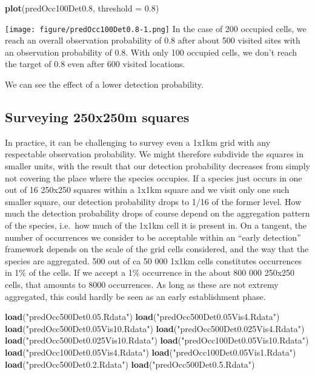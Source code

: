 \documentclass[]{article}
\newenvironment{Shaded}{\begin{snugshade}}{\end{snugshade}}
\newcommand{\KeywordTok}[1]{\textcolor[rgb]{0.13,0.29,0.53}{\textbf{#1}}}
\newcommand{\DataTypeTok}[1]{\textcolor[rgb]{0.13,0.29,0.53}{#1}}
\newcommand{\DecValTok}[1]{\textcolor[rgb]{0.00,0.00,0.81}{#1}}
\newcommand{\FloatTok}[1]{\textcolor[rgb]{0.00,0.00,0.81}{#1}}
\newcommand{\StringTok}[1]{\textcolor[rgb]{0.31,0.60,0.02}{#1}}
\newcommand{\NormalTok}[1]{#1}
\begin{document}
\begin{Shaded}
\begin{Highlighting}[]
\KeywordTok{plot}\NormalTok{(predOcc100Det0.}\DecValTok{8}\NormalTok{, }\DataTypeTok{threshold =} \FloatTok{0.8}\NormalTok{)}
\end{Highlighting}
\end{Shaded}

\texttt{[image: figure/predOcc100Det0.8-1.png]} In the case of 200
occupied cells, we reach an overall observation probability of 0.8 after
about 500 visited sites with an observation probability of 0.8. With
only 100 occupied cells, we don't reach the target of 0.8 even after 600
visited locations.

We can see the effect of a lower detection probability.

\subsection{Surveying 250x250m
squares}\label{surveying-250x250m-squares}

In practice, it can be challenging to survey even a 1x1km grid with any
respectable observation probability. We might therefore subdivide the
squares in smaller units, with the result that our detection probability
decreases from simply not covering the place where the species occupies.
If a species just occurs in one out of 16 250x250 squares within a 1x1km
square and we visit only one such smaller square, our detection
probability drops to 1/16 of the former level. How much the detection
probability drops of course depend on the aggregation pattern of the
species, i.e.~how much of the 1x1km cell it is present in. On a tangent,
the number of occurrences we consider to be acceptable within an ``early
detection'' framework depends on the scale of the grid cells considered,
and the way that the species are aggregated. 500 out of ca 50 000 1x1km
cells constitutes occurrences in 1\% of the cells. If we accept a 1\%
occurrence in the about 800 000 250x250 cells, that amounts to 8000
occurrences. As long as these are not extremy aggregated, this could
hardly be seen as an early establishment phase.

\begin{Shaded}
\begin{Highlighting}[]
\KeywordTok{load}\NormalTok{(}\StringTok{"predOcc500Det0.05.Rdata"}\NormalTok{)}
\KeywordTok{load}\NormalTok{(}\StringTok{"predOcc500Det0.05Vis4.Rdata"}\NormalTok{)}
\KeywordTok{load}\NormalTok{(}\StringTok{"predOcc500Det0.05Vis10.Rdata"}\NormalTok{)}
\KeywordTok{load}\NormalTok{(}\StringTok{"predOcc500Det0.025Vis4.Rdata"}\NormalTok{)}
\KeywordTok{load}\NormalTok{(}\StringTok{"predOcc500Det0.025Vis10.Rdata"}\NormalTok{)}
\KeywordTok{load}\NormalTok{(}\StringTok{"predOcc100Det0.05Vis10.Rdata"}\NormalTok{)}
\KeywordTok{load}\NormalTok{(}\StringTok{"predOcc100Det0.05Vis4.Rdata"}\NormalTok{)}
\KeywordTok{load}\NormalTok{(}\StringTok{"predOcc100Det0.05Vis1.Rdata"}\NormalTok{)}
\KeywordTok{load}\NormalTok{(}\StringTok{"predOcc500Det0.2.Rdata"}\NormalTok{)}
\KeywordTok{load}\NormalTok{(}\StringTok{"predOcc500Det0.5.Rdata"}\NormalTok{)}
\end{Highlighting}
\end{Shaded}
\end{document}
